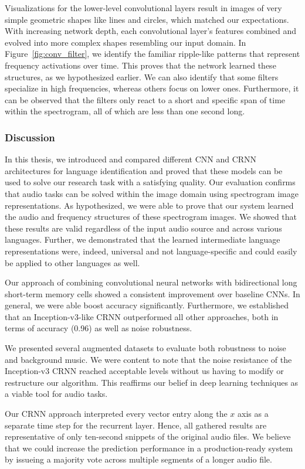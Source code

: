 Visualizations for the lower-level convolutional layers result in images of very simple geometric shapes like lines and circles, which matched our expectations. With increasing network depth, each convolutional layer's features combined and evolved into more complex shapes resembling our input domain. In Figure~\ref{fig:conv_filter}, we identify the familiar ripple-like patterns that represent frequency activations over time. This proves that the network learned these structures, as we hypothesized earlier. We can also identify that some filters specialize in high frequencies, whereas others focus on lower ones. Furthermore, it can be observed that the filters only react to a short and specific span of time within the spectrogram, all of which are less than one second long.

\subsubsection{Discussion}
\label{sec:comparison}
In this thesis, we introduced and compared different CNN and CRNN architectures for language identification and proved that these models can be used to solve our research task with a satisfying quality. Our evaluation confirms that audio tasks can be solved within the image domain using spectrogram image representations. As hypothesized, we were able to prove that our system learned the audio and frequency structures of these spectrogram images. We showed that these results are valid regardless of the input audio source and across various languages. Further, we demonstrated that the learned intermediate language representations were, indeed, universal and not language-specific and could easily be applied to other languages as well.

Our approach of combining convolutional neural networks with bidirectional long short-term memory cells showed a consistent improvement over baseline CNNs. In general, we were able boost accuracy significantly. Furthermore, we established that an Inception-v3-like CRNN outperformed all other approaches, both in terms of accuracy (\num{0.96}) as well as noise robustness.

We presented several augmented datasets to evaluate both robustness to noise and background music. We were content to note that the noise resistance of the Inception-v3 CRNN reached acceptable levels without us having to modify or restructure our algorithm. This reaffirms our belief in deep learning techniques as a viable tool for audio tasks.

Our CRNN approach interpreted every vector entry along the $x$ axis as a separate time step for the recurrent layer. Hence, all gathered results are representative of only ten-second snippets of the original audio files. We believe that we could increase the prediction performance in a production-ready system by issueing a majority vote across multiple segments of a longer audio file.
